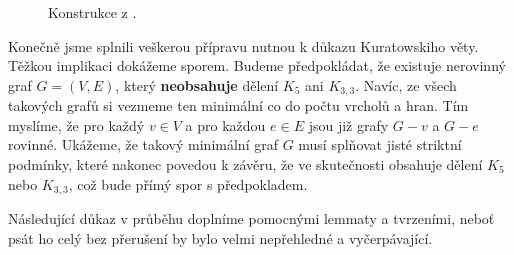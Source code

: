 \begin{figure}[h]
 \centering

 \caption{Konstrukce z .}
 \label{fig:konstrukce-pres-ucha}
\end{figure}

Konečně jsme splnili veškerou přípravu nutnou k důkazu Kuratowskiho věty. Těžkou
implikaci dokážeme sporem. Budeme předpokládat, že existuje nerovinný graf $G =
(V,E)$, který \textbf{neobsahuje} dělení $K_5$ ani $K_{3,3}$. Navíc, ze všech
takových grafů si vezmeme ten minimální co do počtu vrcholů a hran. Tím myslíme,
že pro každý $v \in V$ a pro každou $e \in E$ jsou již grafy $G - v$ a $G - e$
rovinné. Ukážeme, že takový minimální graf $G$ musí splňovat jisté striktní
podmínky, které nakonec povedou k závěru, že ve skutečnosti obsahuje dělení
$K_5$ nebo $K_{3,3}$, což bude přímý spor s předpokladem.

Následující důkaz v průběhu doplníme pomocnými lemmaty a tvrzeními, neboť psát
ho celý bez přerušení by bylo velmi nepřehledné a vyčerpávající.

